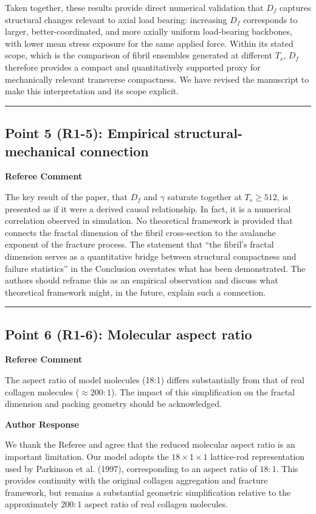 \documentclass[11pt]{article}
\newenvironment{refereecomment}
  {%
    \par
    \begingroup
    \color{commentgray}
    \itshape
    \setlength{\leftskip}{1.4em}
    \setlength{\rightskip}{1.4em}
  }
  {%
    \par
    \endgroup
  }
\newcommand{\refereelabel}{%
  \par\smallskip
  {\color{commentgray}\bfseries Referee Comment}\par
}
\newcommand{\responselabel}{%
  \par\medskip
  {\color{responseblue}\bfseries Author Response}\par
}
\newcommand{\pointseparator}{%
  \par\bigskip
  {\color{rulegray}\hrule}
  \par\bigskip
}
\begin{document}
Taken together, these results provide direct numerical validation that \(D_f\)
captures structural changes relevant to axial load bearing: increasing \(D_f\)
corresponds to larger, better-coordinated, and more axially uniform
load-bearing backbones, with lower mean stress exposure for the same applied
force. Within its stated scope, which is the comparison of fibril ensembles
generated at different \(T_s\), \(D_f\) therefore provides a compact and
quantitatively supported proxy for mechanically relevant transverse
compactness. We have revised the manuscript to make this interpretation and
its scope explicit.

\pointseparator

\subsection*{Point 5 (R1-5): Empirical structural-mechanical connection}

\refereelabel
\begin{refereecomment}
The key result of the paper, that \(D_f\) and \(\gamma\) saturate together at
\(T_s\geq512\), is presented as if it were a derived causal relationship. In
fact, it is a numerical correlation observed in simulation. No theoretical
framework is provided that connects the fractal dimension of the fibril
cross-section to the avalanche exponent of the fracture process. The statement
that ``the fibril's fractal dimension serves as a quantitative bridge between
structural compactness and failure statistics'' in the Conclusion overstates
what has been demonstrated. The authors should reframe this as an empirical
observation and discuss what theoretical framework might, in the future,
explain such a connection.
\end{refereecomment}

\pointseparator

\subsection*{Point 6 (R1-6): Molecular aspect ratio}

\refereelabel
\begin{refereecomment}
The aspect ratio of model molecules (18:1) differs substantially from that of
real collagen molecules (\(\approx 200{:}1\)). The impact of this
simplification on the fractal dimension and packing geometry should be
acknowledged.
\end{refereecomment}

\responselabel
We thank the Referee and agree that the reduced molecular aspect ratio is an
important limitation. Our model adopts the \(18\times1\times1\) lattice-rod
representation used by Parkinson et al. (1997), corresponding to an aspect
ratio of \(18{:}1\). This provides continuity with the original collagen
aggregation and fracture framework, but remains a substantial geometric
simplification relative to the approximately \(200{:}1\) aspect ratio of real
collagen molecules.
\end{document}
